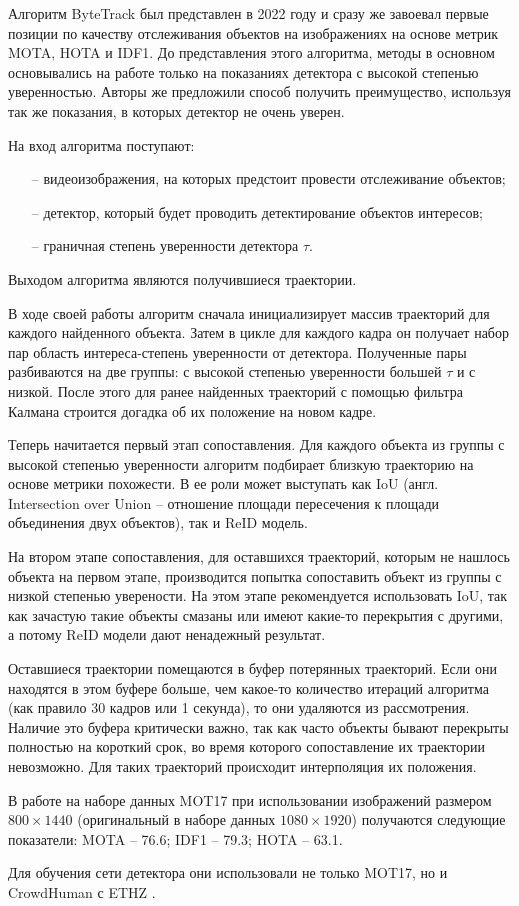 Алгоритм ByteTrack \cite{zhang2022bytetrack} был представлен в 2022 году и сразу же завоевал первые позиции по качеству отслеживания объектов на изображениях на основе метрик MOTA, HOTA и IDF1.
До представления этого алгоритма, методы в основном основывались на работе только на показаниях детектора с высокой степенью уверенностью. Авторы же предложили способ получить преимущество, используя так же показания, в которых детектор не очень уверен.

На вход алгоритма поступают:
\begin{itemize}
    \item[--] видеоизображения, на которых предстоит провести отслеживание объектов;
    \item[--] детектор, который будет проводить детектирование объектов интересов;
    \item[--] граничная степень уверенности детектора \(\tau\). 
\end{itemize}
Выходом алгоритма являются получившиеся траектории. 

В ходе своей работы алгоритм сначала инициализирует массив траекторий для каждого найденного объекта. 
Затем в цикле для каждого кадра он получает набор пар область интереса-степень уверенности от детектора.
Полученные пары разбиваются на две группы: с высокой степенью уверенности большей \(\tau\) и с низкой. 
После этого для ранее найденных траекторий с помощью фильтра Калмана строится догадка об их положение на новом кадре.

Теперь начитается первый этап сопоставления. Для каждого объекта из группы с высокой степенью уверенности алгоритм подбирает близкую траекторию на основе метрики похожести. В ее роли может выступать как IoU (англ. Intersection over Union -- отношение площади пересечения к площади объединения двух объектов), так и ReID модель. 

На втором этапе сопоставления, для оставшихся траекторий, которым не нашлось объекта на первом этапе, производится попытка сопоставить объект из группы с низкой степенью уверености. На этом этапе рекомендуется использовать IoU, так как зачастую такие объекты смазаны или имеют какие-то перекрытия с другими, а потому ReID модели дают ненадежный результат.

Оставшиеся траектории помещаются в буфер потерянных траекторий. Если они находятся в этом буфере больше, чем какое-то количество итераций алгоритма (как правило 30 кадров или 1 секунда), то они удаляются из рассмотрения. Наличие это буфера критически важно, так как часто объекты бывают перекрыты полностью на короткий срок, во время которого сопоставление их траектории невозможно. Для таких траекторий происходит интерполяция их положения.

В работе на наборе данных MOT17 при использовании изображений размером \(800 \times 1440\) (оригинальный в наборе данных \(1080 \times 1920\)) получаются следующие показатели: MOTA -- 76.6; IDF1 -- 79.3; HOTA -- 63.1.

Для обучения сети детектора они использовали не только MOT17, но и CrowdHuman \cite{shao2018crowdhuman} с ETHZ \cite{ess2008mobile}.


